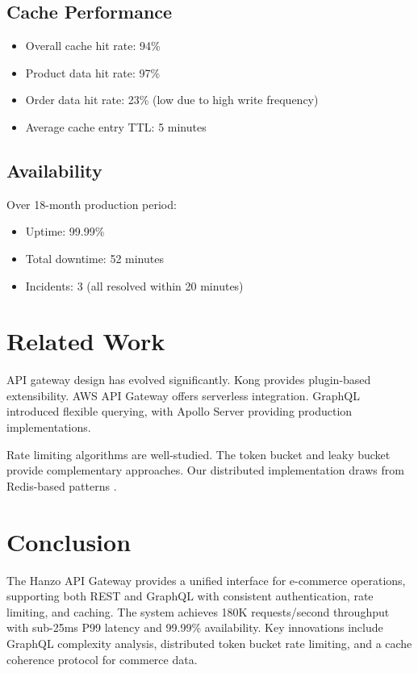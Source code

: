 \documentclass[11pt,a4paper]{article}
\begin{document}
\subsection{Cache Performance}

\begin{itemize}
    \item Overall cache hit rate: 94\%
    \item Product data hit rate: 97\%
    \item Order data hit rate: 23\% (low due to high write frequency)
    \item Average cache entry TTL: 5 minutes
\end{itemize}

\subsection{Availability}

Over 18-month production period:
\begin{itemize}
    \item Uptime: 99.99\%
    \item Total downtime: 52 minutes
    \item Incidents: 3 (all resolved within 20 minutes)
\end{itemize}

\section{Related Work}

API gateway design has evolved significantly. Kong \cite{kong2019} provides plugin-based extensibility. AWS API Gateway \cite{aws2019} offers serverless integration. GraphQL \cite{graphql2015} introduced flexible querying, with Apollo Server \cite{apollo2019} providing production implementations.

Rate limiting algorithms are well-studied. The token bucket \cite{turner1986} and leaky bucket \cite{bellovin1999} provide complementary approaches. Our distributed implementation draws from Redis-based patterns \cite{redis2019}.

\section{Conclusion}

The Hanzo API Gateway provides a unified interface for e-commerce operations, supporting both REST and GraphQL with consistent authentication, rate limiting, and caching. The system achieves 180K requests/second throughput with sub-25ms P99 latency and 99.99\% availability. Key innovations include GraphQL complexity analysis, distributed token bucket rate limiting, and a cache coherence protocol for commerce data.
\end{document}

